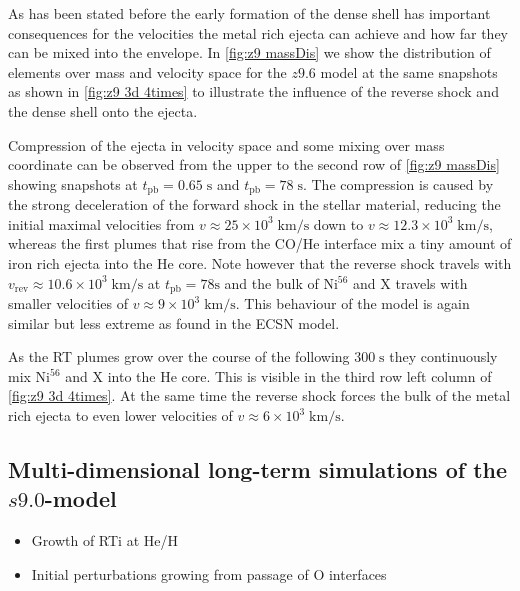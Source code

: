 \documentclass[fleqn,usenatbib]{mnras}
\newcommand{\nickel}{$\mathrm{Ni^{56}}$\xspace}
\newcommand{\tracer}{$\mathrm{X}$\xspace}
\renewcommand{\sec}{\xspace\ensuremath{\mathrm{s}}}
\newcommand{\COM}[1]{{\color{red}#1}}
\begin{document}
As has been stated before the early formation of the dense shell has important consequences for the velocities the metal rich ejecta can achieve and how far they can be mixed into the envelope.
In \autoref{fig:z9 massDis} we show the distribution of elements over mass and velocity space for the $z9.6$ model at the same snapshots as shown in \autoref{fig:z9 3d  4times} to illustrate the influence of the reverse shock and the dense shell onto the ejecta.

Compression of the ejecta in velocity space and some mixing over mass coordinate can be observed from the upper to the second row of \autoref{fig:z9 massDis} showing snapshots at $t_{\mathrm{pb}}=0.65\;\mathrm{s}$ and $t_{\mathrm{pb}}=78\;\sec$. The compression is caused by the strong deceleration of the forward shock in the stellar material, reducing the initial maximal velocities from $v\approx 25\times10^3\;\mathrm{km/s}$ down to $v\approx 12.3\times10^3\;\mathrm{km/s}$, whereas the first plumes that rise from the CO/He interface mix a tiny amount of iron rich ejecta into the He core. Note however that the reverse shock travels with $v_{\mathrm{rev}}\approx 10.6\times10^3\;\mathrm{km/s}$ at $t_{\mathrm{pb}}=78\sec$ and the bulk of \nickel and \tracer travels with smaller velocities of $v\approx 9\times10^3\;\mathrm{km/s}$. This behaviour of the model is again similar but less extreme as found in the ECSN model.

As the RT plumes grow over the course of the following $300\;\mathrm{s}$ they continuously mix \nickel and \tracer into the He core. This is visible in the third row left column of \autoref{fig:z9 3d 4times}. At the same time the reverse shock forces the bulk of the metal rich ejecta to even lower velocities of  $v\approx 6\times10^3\;\mathrm{km/s}$. 

\subsection{Multi-dimensional long-term simulations of the $s9.0$-model}
\label{subsec:Multi-dimensional long-term simulations of the s9.0-model}
\COM{
\begin{itemize}
    \item Growth of RTi at He/H
    \item Initial perturbations growing from passage of O interfaces
\end{itemize}
}
\end{document}
